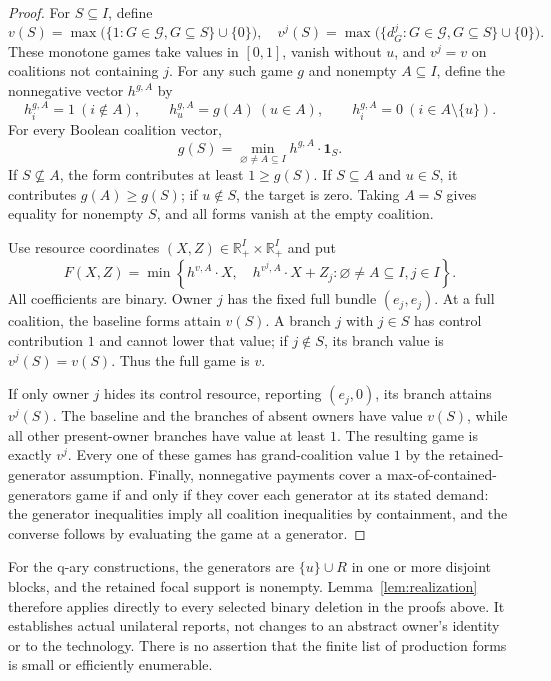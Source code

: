 \begin{proof}
For $S\subseteq I$, define
\[
 v(S)=\max\bigl(\{1:G\in\mathcal G, G\subseteq S\}\cup\{0\}\bigr),
 \quad
 v^j(S)=\max\bigl(\{d_G^j:G\in\mathcal G, G\subseteq S\}\cup\{0\}\bigr).
\]
These monotone games take values in $[0,1]$, vanish without $u$, and
$v^j=v$ on coalitions not containing $j$.  For any such game $g$ and
nonempty $A\subseteq I$, define the nonnegative vector $h^{g,A}$ by
\[
 h_i^{g,A}=1\ (i\notin A),\qquad
 h_u^{g,A}=g(A)\ (u\in A),\qquad
 h_i^{g,A}=0\ (i\in A\setminus\{u\}).
\]
For every Boolean coalition vector,
\begin{equation}
 g(S)=\min_{\varnothing\ne A\subseteq I} h^{g,A}\cdot\mathbf1_S.
 \label{eq:game-forms}
\end{equation}
If $S\not\subseteq A$, the form contributes at least $1\ge g(S)$.
If $S\subseteq A$ and $u\in S$, it contributes $g(A)\ge g(S)$; if
$u\notin S$, the target is zero.  Taking $A=S$ gives equality for
nonempty $S$, and all forms vanish at the empty coalition.

Use resource coordinates $(X,Z)\in\mathbb R_+^I\times\mathbb R_+^I$ and
put
\begin{equation}
 F(X,Z)=\min\left\{
 h^{v,A}\cdot X,\quad h^{v^j,A}\cdot X+Z_j:
       \varnothing\ne A\subseteq I, j\in I\right\}.
 \label{eq:direct-production}
\end{equation}
All coefficients are binary.  Owner $j$ has the fixed full bundle
$(e_j,e_j)$.  At a full coalition, the baseline forms attain $v(S)$.
A branch $j$ with $j\in S$ has control contribution $1$ and cannot lower
that value; if $j\notin S$, its branch value is $v^j(S)=v(S)$.
Thus the full game is $v$.

If only owner $j$ hides its control resource, reporting $(e_j,0)$, its
branch attains $v^j(S)$.  The baseline and the branches of absent owners
have value $v(S)$, while all other present-owner branches have value at
least $1$.  The resulting game is exactly $v^j$.  Every one of these
games has grand-coalition value $1$ by the retained-generator assumption.
Finally, nonnegative payments cover a max-of-contained-generators game
if and only if they cover each generator at its stated demand: the
generator inequalities imply all coalition inequalities by containment,
and the converse follows by evaluating the game at a generator.
\end{proof}

For the q-ary constructions, the generators are $\{u\}\cup R$ in one
or more disjoint blocks, and the retained focal support is nonempty.
Lemma~\ref{lem:realization} therefore applies directly to every selected
binary deletion in the proofs above.  It establishes actual unilateral
reports, not changes to an abstract owner's identity or to the technology.
There is no assertion that the finite list of production forms is small
or efficiently enumerable.

